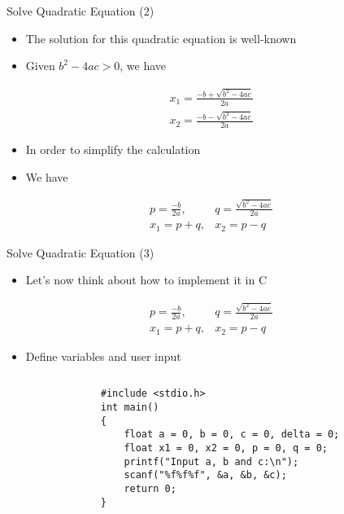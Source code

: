 \begin{frame}[fragile]{Solve Quadratic Equation (2)}
\begin{itemize}
	\item {The solution for this quadratic equation is well-known}
	\item {Given $b^2-4ac > 0$, we have}
\end{itemize}
\begin{eqnarray}
x_1=\frac{-b+\sqrt{b^2-4ac}}{2a} \nonumber \\
x_2=\frac{-b-\sqrt{b^2-4ac}}{2a} \nonumber 
\end{eqnarray}
\begin{itemize}
	\item {In order to simplify the calculation}
	\item {We have}
\end{itemize}
\begin{eqnarray}
p=\frac{-b}{2a}, & q=\frac{\sqrt{b^2-4ac}}{2a} \nonumber \\
x_1=p+q, & x_2=p-q \nonumber 
\end{eqnarray}

\end{frame}

\begin{frame}[fragile]{Solve Quadratic Equation (3)}
\begin{itemize}
	\item {Let's now think about how to implement it in C}
\end{itemize}
\begin{eqnarray}
p=\frac{-b}{2a}, & q=\frac{\sqrt{b^2-4ac}}{2a} \nonumber \\
x_1=p+q, & x_2=p-q \nonumber
\end{eqnarray}
	\begin{itemize}
		\item {Define variables and user input}
	\end{itemize}
\vspace{-0.12in}
	\begin{columns}
		\begin{column}{0.1\linewidth}
		\end{column}
		\begin{column}{0.9\linewidth}
	\begin{lstlisting}[]
#include <stdio.h>
int main()
{
    float a = 0, b = 0, c = 0, delta = 0;
    float x1 = 0, x2 = 0, p = 0, q = 0;
    printf("Input a, b and c:\n");
    scanf("%f%f%f", &a, &b, &c);
    return 0;
}
	\end{lstlisting}
	\end{column}
	\end{columns}
\end{frame}


